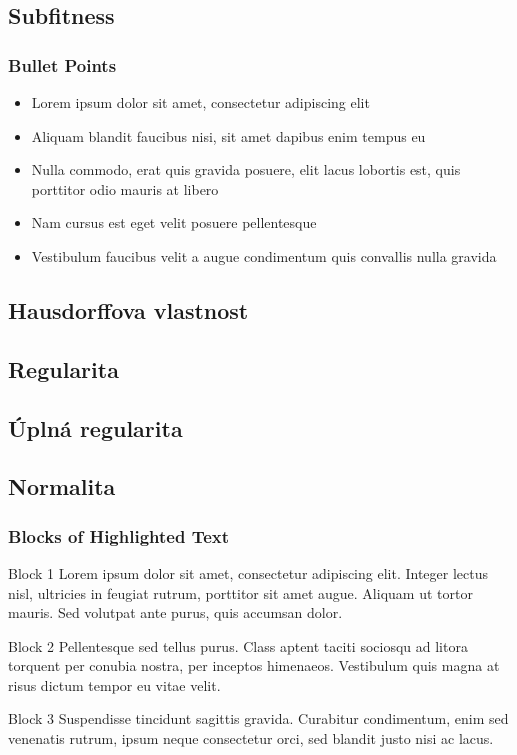 \documentclass[mathserif]{beamer}
\begin{document}

\subsection{Subfitness}

\begin{frame}
\frametitle{Bullet Points}
\begin{itemize}
\item Lorem ipsum dolor sit amet, consectetur adipiscing elit
\item Aliquam blandit faucibus nisi, sit amet dapibus enim tempus eu
\item Nulla commodo, erat quis gravida posuere, elit lacus lobortis est, quis porttitor odio mauris at libero
\item Nam cursus est eget velit posuere pellentesque
\item Vestibulum faucibus velit a augue condimentum quis convallis nulla gravida
\end{itemize}
\end{frame}


\subsection{Hausdorffova vlastnost}

\subsection{Regularita}

\subsection{Úplná regularita}

\subsection{Normalita}

\begin{frame}
\frametitle{Blocks of Highlighted Text}
\begin{block}{Block 1}
Lorem ipsum dolor sit amet, consectetur adipiscing elit. Integer lectus nisl, ultricies in feugiat rutrum, porttitor sit amet augue. Aliquam ut tortor mauris. Sed volutpat ante purus, quis accumsan dolor.
\end{block}

\begin{block}{Block 2}
Pellentesque sed tellus purus. Class aptent taciti sociosqu ad litora torquent per conubia nostra, per inceptos himenaeos. Vestibulum quis magna at risus dictum tempor eu vitae velit.
\end{block}

\begin{block}{Block 3}
Suspendisse tincidunt sagittis gravida. Curabitur condimentum, enim sed venenatis rutrum, ipsum neque consectetur orci, sed blandit justo nisi ac lacus.
\end{block}
\end{frame}
\end{document}
